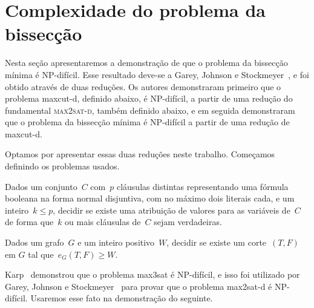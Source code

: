 \section {Complexidade do problema da bissecção}

	Nesta seção apresentaremos a demonstração de que o problema 
	da bissecção mínima é NP-difícil.
	Esse resultado deve-se a Garey, Johnson e Stockmeyer~\cite{GareyJS76},
	e foi obtido através de duas reduções.
	Os autores demonstraram primeiro que o problema {\sc maxcut-d},
	definido abaixo, é NP-difícil, a partir de uma redução do
	fundamental \textsc {max2sat-d}, também definido abaixo, e em seguida
	demonstraram que o problema da bissecção mínima é NP-difícil
	a partir de uma redução de {\sc maxcut-d}.

	Optamos por apresentar essas duas reduções neste trabalho.
	Começamos definindo os problemas usados.



	\medskip

	\begin{prob}
		Dados um conjunto~$C$ com~$p$ cláusulas distintas 
		representando uma fórmula booleana
		na forma 
		normal disjuntiva, com no máximo
		dois literais cada, e um inteiro~${k\le p}$,
		decidir se existe uma atribuição de valores para as variáveis de~$C$ de forma
		que~$k$ ou mais cláusulas de~$C$ sejam verdadeiras.

	\end{prob}

	\medskip

	\begin{prob}
		Dados um grafo~${G}$
		e um inteiro positivo~${W}$, decidir se existe um
		corte~$(T,F)$ em $G$ tal 
		que~${e_G(T,F)\ge W}$.
		
	\end{prob}


	Karp~\cite{Kar72} demonstrou que o problema 
	{\sc max3sat} é NP-difícil,
	e isso foi utilizado por Garey, 
	Johnson e Stockmeyer~\cite{GareyJS76} 
	para provar que 
	o problema {\sc max2sat-d} é NP-difícil.
	Usaremos esse fato na demonstração do seguinte.


